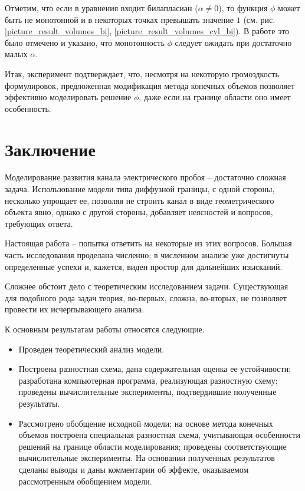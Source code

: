 \documentclass[a4paper,12pt]{article}
\theoremstyle{plain}
\theoremstyle{definition}
\begin{document}
Отметим, что если в уравнения входит билапласиан ($\alpha \neq 0$), то функция $\phi$ может быть не монотонной и в некоторых точках превышать значение $1$ (см. рис. \ref{picture_result_volumes_bi}, \ref{picture_result_volumes_cyl_bi}). В работе \cite{zipunova_higher_codimension} это было отмечено и указано, что монотонность $\phi$ следует ожидать при достаточно малых $\alpha$.

Итак, эксперимент подтверждает, что, несмотря на некоторую громоздкость формулировок, предложенная модификация метода конечных объемов позволяет эффективно моделировать решение $\phi$, даже если на границе области оно имеет особенность.


\section{Заключение}

Моделирование развития канала электрического пробоя -- достаточно сложная задача. Использование модели типа диффузной границы, с одной стороны, несколько упрощает ее, позволяя не строить канал в виде геометрического объекта явно, однако с другой стороны, добавляет неясностей и вопросов, требующих ответа.

Настоящая работа -- попытка ответить на некоторые из этих вопросов. Большая часть исследования проделана численно; в численном анализе уже достигнуты определенные успехи и, кажется, виден простор для дальнейших изысканий.

Сложнее обстоит дело с теоретическим исследованием задачи. Существующая для подобного рода задач теория, во-первых, сложна, во-вторых, не позволяет провести их исчерпывающего анализа.

К основным результатам работы относятся следующие.
\begin{itemize}
    \item Проведен теоретический анализ модели.
    \item Построена разностная схема, дана содержательная оценка ее устойчивости; разработана  компьютерная программа, реализующая разностную схему; проведены вычислительные эксперименты, подтвердившие полученные результаты. 
    \item Рассмотрено обобщение исходной модели; на основе метода конечных объемов построена специальная разностная схема, учитывающая особенности решений на границе области моделирования; проведены соответствующие вычислительные эксперименты. На основании полученных результатов сделаны выводы и даны комментарии об эффекте, оказываемом рассмотренным обобщением модели.
\end{itemize}


\printbibliography
\end{document}
